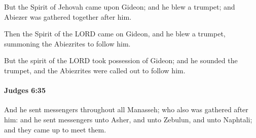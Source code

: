 			\begin{versebox}
					\item[BHS] 
					\item[ASV] But the Spirit of Jehovah came upon Gideon; and he blew a trumpet; and Abiezer was gathered together after him.
					\item[NIV] Then the Spirit of the LORD came on Gideon, and he blew a trumpet, summoning the Abiezrites to follow him.
					\item[NRSV] But the spirit of the LORD took possession of Gideon; and he sounded the trumpet, and the Abiezrites were called out to follow him.
			\end{versebox}

		\paragraph{Judges 6:35} %
			\label{JUDGES-6-35}

			And he sent messengers throughout all Manasseh; who also was gathered after him: and he sent messengers unto Asher, and unto Zebulun, and unto Naphtali; and they came up to meet them.

